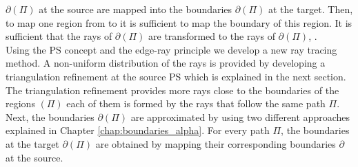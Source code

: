 $\partial$$(\Pi)$ at the source are mapped into the boundaries $\partial$$(\Pi)$ at the target.
Then, to map one region from  to  it is sufficient to map the boundary of this region. 
It is sufficient that the rays of  $\partial$$(\Pi)$ are transformed to the rays of $\partial$$(\Pi)$, \cite{minano1992new, davies1994edge}. 
\\ \indent Using the PS concept and the edge-ray principle we develop a new ray tracing method. 
A non-uniform distribution of the rays is provided by developing a triangulation refinement at the source PS which is explained in the next section. 
The triangulation refinement provides more rays close to the boundaries of the regions $(\Pi)$ each of them is formed by the rays that follow the same path $\Pi$.
Next, the boundaries $\partial$$(\Pi)$ are approximated by using two different approaches explained in Chapter \ref{chap:boundaries_alpha}. For every path $\Pi$, the boundaries at the target $\partial$$(\Pi)$ are obtained by mapping their corresponding boundaries $\partial$ at the source.
